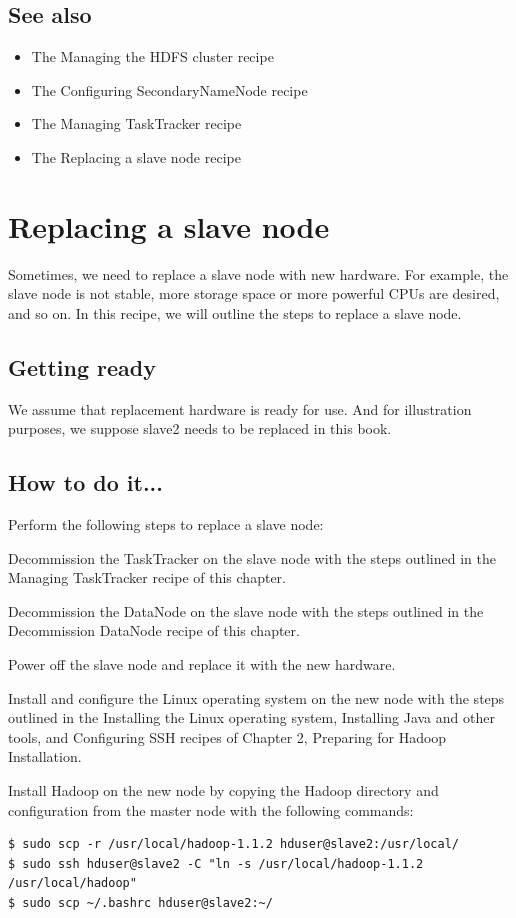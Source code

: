 \subsection*{See also}
\begin{itemize}
  \item The Managing the HDFS cluster recipe
  \item The Configuring SecondaryNameNode recipe
  \item The Managing TaskTracker recipe
  \item The Replacing a slave node recipe
\end{itemize}

\section{Replacing a slave node}
Sometimes, we need to replace a slave node with new hardware. For example, the slave node is not stable, more storage space or more powerful CPUs are desired, and so on. In this recipe, we will outline the steps to replace a slave node.

\subsection*{Getting ready}
We assume that replacement hardware is ready for use. And for illustration purposes, we suppose slave2 needs to be replaced in this book.

\subsection*{How to do it...}
Perform the following steps to replace a slave node:

Decommission the TaskTracker on the slave node with the steps outlined in the Managing TaskTracker recipe of this chapter. 

Decommission the DataNode on the slave node with the steps outlined in the Decommission DataNode recipe of this chapter. 


Power off the slave node and replace it with the new hardware.

Install and configure the Linux operating system on the new node with the steps outlined in the Installing the Linux operating system, Installing Java and other tools, and Configuring SSH recipes of Chapter 2, Preparing for Hadoop Installation.

Install Hadoop on the new node by copying the Hadoop directory and configuration from the master node with the following commands: \\
\begin{verbatim}
$ sudo scp -r /usr/local/hadoop-1.1.2 hduser@slave2:/usr/local/
$ sudo ssh hduser@slave2 -C "ln -s /usr/local/hadoop-1.1.2 /usr/local/hadoop"
$ sudo scp ~/.bashrc hduser@slave2:~/
\end{verbatim}

